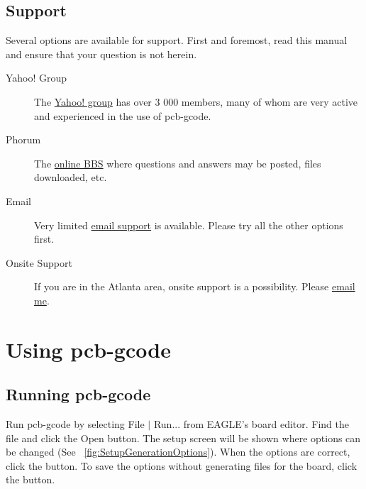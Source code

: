 \documentclass[11pt]{book}
\begin{document}
%
%
\newpage
\section{Support}\label{sec:Support}

Several options are available for support. First and foremost, read this manual and ensure that your question is not herein.

\begin{description}
    \item[Yahoo! Group] The \href{https://groups.yahoo.com/group/pcb-gcode}{Yahoo! group} has over 3 000 members, many of whom are very active and experienced in the use of pcb-gcode.
    \item[Phorum] The \href{http://pcbgcode.org}{online BBS} where questions and answers may be posted, files downloaded, etc.
    \item[Email] Very limited \href{mailto:pcbgcode@pcbgcode.org}{email support} is available. Please try all the other options first.
    \item[On\-site Support] If you are in the Atlanta area, on\-site support is a possibility. Please \href{mailto:pcbgcode@pcbgcode.org}{email me}.
\end{description}


%
\chapter{Using pcb-gcode}
%

%
%
\section{Running pcb-gcode}\label{sec:running}

Run pcb-gcode by selecting File $|$ Run... from EAGLE's board editor. Find the file  and click the Open button. The setup screen will be shown where options can be changed (See \figurename~\ref{fig:SetupGenerationOptions}). When the options are correct, click the  button. To save the options without generating files for the board, click the  button.
\end{document}
